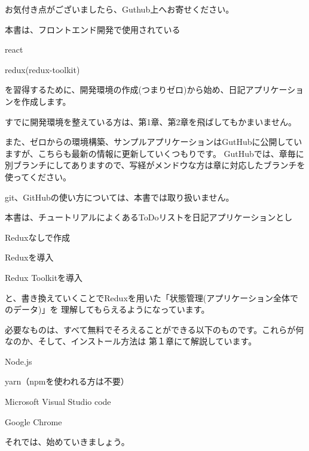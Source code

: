 \vspace*{\baselineskip}

お気付き点がございましたら、Guthub上へお寄せください。

\vspace*{\baselineskip}

本書は、フロントエンド開発で使用されている

\begin{starteritemize}
\item react
\item redux(redux{-}toolkit)
\end{starteritemize}

を習得するために、開発環境の作成(つまりゼロ)から始め、日記アプリケーションを作成します。

\vspace*{\baselineskip}

すでに開発環境を整えている方は、第1章、第2章を飛ばしてもかまいません。

\vspace*{\baselineskip}

また、ゼロからの環境構築、サンプルアプリケーションはGutHubに公開していますが、こちらも最新の情報に更新していくつもりです。
GutHubでは、章毎に別ブランチにしてありますので、写経がメンドウな方は章に対応したブランチを使ってください。

\vspace*{\baselineskip}

git、GitHubの使い方については、本書では取り扱いません。

\vspace*{\baselineskip}

本書は、チュートリアルによくあるToDoリストを日記アプリケーションとし

\begin{starterenumerate}
\item Reduxなしで作成
\item Reduxを導入
\item Redux Toolkitを導入
\end{starterenumerate}

と、書き換えていくことでReduxを用いた「状態管理(アプリケーション全体でのデータ)」を
理解してもらえるようになっています。

\vspace*{\baselineskip}

必要なものは、すべて無料でそろえることができる以下のものです。これらが何なのか、そして、インストール方法は
第１章にて解説しています。

\begin{starteritemize}
\item Node.js
\item yarn（npmを使われる方は不要）
\item Microsoft Visual Studio code
\item Google Chrome
\end{starteritemize}

\vspace*{\baselineskip}

それでは、始めていきましょう。
